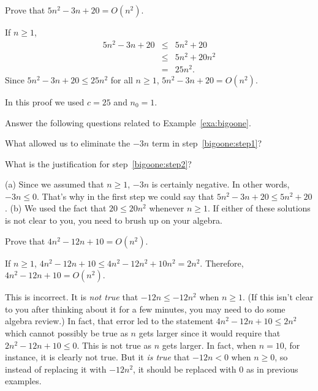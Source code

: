 \begin{exa}\label{exa:bigoone}
Prove that $5n^{2}- 3n +20=O(n^2)$.
\begin{sol} 
If $n\geq 1$,
\begin{eqnarray}
\label{bigoone:step1}5n^{2} - 3n + 20 &\leq& 5n^{2} + 20 \\ 
\label{bigoone:step2}&\leq&5n^2+20n^2\\ 
&=&25n^2.
\end{eqnarray}
Since $5n^{2} - 3n + 20 \leq 25n^2$ for all $n\geq 1$,
$5n^{2} - 3n +20=O(n^2)$.

In this proof we used $c=25$ and $n_0=1$.
\end{sol}
\end{exa}

\begin{ques}
Answer the following questions related to Example~\ref{exa:bigoone}.
\begin{lenum}
\item
What allowed us to eliminate the $-3n$ term in step~\ref{bigoone:step1}?
\blanklinetwo
\item
What is the justification for step~\ref{bigoone:step2}?
\blanklinefill
\end{lenum}
\begin{answer}
(a) Since we assumed that $n\geq 1$, $-3n$ is certainly negative.  In other words,
$-3n\leq 0$.  That's why in the first step we could say that $5n^2-3n+20\leq 5n^2+20$.
(b) We used the fact that $20\leq 20n^2$ whenever $n\geq 1$.
If either of these solutions is not clear to you, 
you need to brush up on your algebra.
\end{answer}
\end{ques}


\begin{eval}
Prove that $4n^{2}- 12n +10=O(n^2)$.
\begin{ssol}
If $n\geq 1$, $4 n^{2} - 12n + 10 \leq 
4 n^{2} - 12n^2 + 10n^2 =2n^2.$
Therefore,  $4n^{2} - 12n +10=O(n^2)$.
\end{ssol}
\evallinetwo
\begin{answer}
This is incorrect.  
It is {\em not true} that $-12n\leq -12n^2$ when $n\geq 1$.
(If this isn't clear to you after thinking about it for a few minutes, you may need to
do some algebra review.)
In fact, that error led to the statement
$4 n^{2} - 12n + 10\leq 2n^2$ which cannot possibly be true as $n$ gets larger
since it would require that $2n^2-12n+10\leq 0$.
This is not true as $n$ gets larger.  
In fact, when $n=10$, for instance, it is clearly not true.
But it {\em is true} that $-12n<0$ when $n\geq 0$, so instead of replacing it
with $-12n^2$, it should be replaced with $0$ as in previous examples.
\end{answer}
\end{eval}

